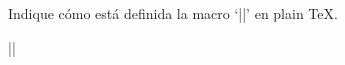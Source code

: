 


\bigskip

\enunciadoS Indique c\'omo est\'a definida la macro `|\break|' en
plain {\TeX}.

\bigskip

\respuesta{}

|\def\break{\penalty -1000}|

\bye

